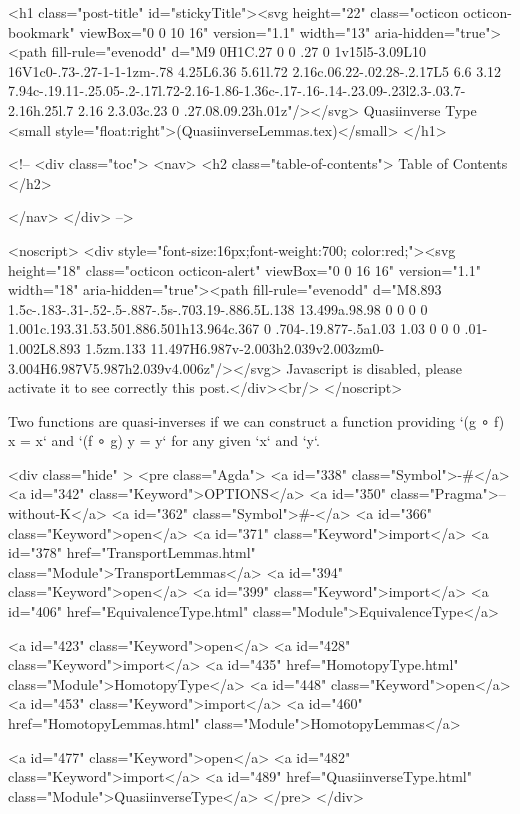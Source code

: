   <h1 class="post-title" id="stickyTitle"><svg height="22" class="octicon octicon-bookmark" viewBox="0 0 10 16" version="1.1" width="13" aria-hidden="true"><path fill-rule="evenodd" d="M9 0H1C.27 0 0 .27 0 1v15l5-3.09L10 16V1c0-.73-.27-1-1-1zm-.78 4.25L6.36 5.61l.72 2.16c.06.22-.02.28-.2.17L5 6.6 3.12 7.94c-.19.11-.25.05-.2-.17l.72-2.16-1.86-1.36c-.17-.16-.14-.23.09-.23l2.3-.03.7-2.16h.25l.7 2.16 2.3.03c.23 0 .27.08.09.23h.01z"/></svg> Quasiinverse Type <small style="float:right">(QuasiinverseLemmas.tex)</small>
  </h1>

  <!-- 
  <div class="toc">
    <nav>
    <h2 class="table-of-contents"> Table of Contents </h2>
      

    </nav>
  </div>
   -->

  <noscript>
  <div style="font-size:16px;font-weight:700; color:red;"><svg height="18" class="octicon octicon-alert" viewBox="0 0 16 16" version="1.1" width="18" aria-hidden="true"><path fill-rule="evenodd" d="M8.893 1.5c-.183-.31-.52-.5-.887-.5s-.703.19-.886.5L.138 13.499a.98.98 0 0 0 0 1.001c.193.31.53.501.886.501h13.964c.367 0 .704-.19.877-.5a1.03 1.03 0 0 0 .01-1.002L8.893 1.5zm.133 11.497H6.987v-2.003h2.039v2.003zm0-3.004H6.987V5.987h2.039v4.006z"/></svg> Javascript is disabled, please activate it to see correctly this post.</div><br/>
  </noscript>

  Two functions are quasi-inverses if we can construct a function providing
`(g ∘ f) x = x` and `(f ∘ g) y = y` for any given `x` and `y`.

<div class="hide" >
<pre class="Agda">
<a id="338" class="Symbol">{-#</a> <a id="342" class="Keyword">OPTIONS</a> <a id="350" class="Pragma">--without-K</a> <a id="362" class="Symbol">#-}</a>
<a id="366" class="Keyword">open</a> <a id="371" class="Keyword">import</a> <a id="378" href="TransportLemmas.html" class="Module">TransportLemmas</a>
<a id="394" class="Keyword">open</a> <a id="399" class="Keyword">import</a> <a id="406" href="EquivalenceType.html" class="Module">EquivalenceType</a>

<a id="423" class="Keyword">open</a> <a id="428" class="Keyword">import</a> <a id="435" href="HomotopyType.html" class="Module">HomotopyType</a>
<a id="448" class="Keyword">open</a> <a id="453" class="Keyword">import</a> <a id="460" href="HomotopyLemmas.html" class="Module">HomotopyLemmas</a>


<a id="477" class="Keyword">open</a> <a id="482" class="Keyword">import</a> <a id="489" href="QuasiinverseType.html" class="Module">QuasiinverseType</a>
</pre>
</div>

